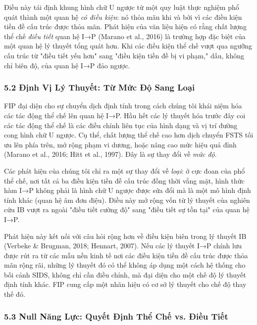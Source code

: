\documentclass[12pt,a4paper]{article}
\begin{document}
Điều này tái định khung hình chữ U ngược từ một quy luật thực nghiệm phổ
quát thành một quan hệ \emph{có điều kiện}: nó thỏa mãn khi và bởi vì
các điều kiện tiền đề cấu trúc được thỏa mãn. Phát hiện của văn liệu
hiện có rằng chất lượng thể chế \emph{điều tiết} quan hệ I→P (Marano et
al., 2016) là trường hợp đặc biệt của một quan hệ lý thuyết tổng quát
hơn. Khi các điều kiện thể chế vượt qua ngưỡng cấu trúc từ "điều tiết
yếu hơn" sang "điều kiện tiền đề bị vi phạm," dấu, không chỉ biên độ,
của quan hệ I→P đảo ngược.

\hypertarget{52-ux111ux1ecbnh-vux1ecb-luxfd-thuyux1ebft-tux1eeb-mux1ee9c-ux111ux1ed9-sang-loux1ea1i}{%
\subsubsection{5.2 Định Vị Lý Thuyết: Từ Mức Độ Sang
Loại}\label{52-ux111ux1ecbnh-vux1ecb-luxfd-thuyux1ebft-tux1eeb-mux1ee9c-ux111ux1ed9-sang-loux1ea1i}}

FIP đại diện cho sự chuyển dịch định tính trong cách chúng tôi khái niệm
hóa các tác động thể chế lên quan hệ I→P. Hầu hết các lý thuyết hóa
trước đây coi các tác động thể chế là các điều chỉnh liên tục của hình
dạng và vị trí đường cong hình chữ U ngược. Cụ thể, chất lượng thể chế
cao hơn dịch chuyển FSTS tối ưu lên phía trên, mở rộng phạm vi dương,
hoặc nâng cao mức hiệu quả đỉnh (Marano et al., 2016; Hitt et al.,
1997). Đây là sự thay đổi về \emph{mức độ}.

Các phát hiện của chúng tôi chỉ ra một sự thay đổi về \emph{loại}: ở cực
đoan của phổ thể chế, nơi tất cả ba điều kiện tiền đề cấu trúc đồng thời
vắng mặt, hình thức hàm I→P không phải là hình chữ U ngược được sửa đổi
mà là một mô hình định tính khác (quan hệ âm đơn điệu). Điều này mở rộng
vốn từ lý thuyết của nghiên cứu IB vượt ra ngoài "điều tiết cường độ"
sang "điều tiết sự tồn tại" của quan hệ I→P.

Phát hiện này kết nối với câu hỏi rộng hơn về điều kiện biên trong lý
thuyết IB (Verbeke \& Brugman, 2018; Hennart, 2007). Nếu các lý thuyết
I→P chính lưu được rút ra từ các mẫu nền kinh tế nơi các điều kiện tiền
đề cấu trúc được thỏa mãn rộng rãi, những lý thuyết đó có thể không áp
dụng một cách hệ thống cho bối cảnh SIDS, không chỉ cần điều chỉnh, mà
đại diện cho một chế độ lý thuyết định tính khác. FIP cung cấp một nhãn
hiệu có cơ sở lý thuyết cho chế độ thay thế đó.

\hypertarget{53-null-nux103ng-lux1ef1c-quyux1ebft-ux111ux1ecbnh-thux1ec3-chux1ebf-vs-ux111iux1ec1u-tiux1ebft}{%
\subsubsection{5.3 Null Năng Lực: Quyết Định Thể Chế vs. Điều
Tiết}\label{53-null-nux103ng-lux1ef1c-quyux1ebft-ux111ux1ecbnh-thux1ec3-chux1ebf-vs-ux111iux1ec1u-tiux1ebft}}
\end{document}
